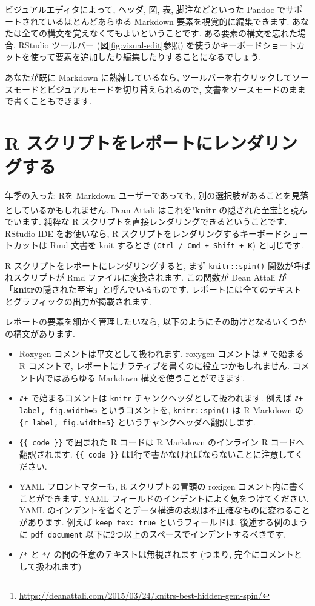 \documentclass[
  11pt,
]{bxjsreport}
\renewcommand{\href}[2]{#2\footnote{\url{#1}}}
\begin{document}
ビジュアルエディタによって, ヘッダ, 図, 表, 脚注などといった Pandoc でサポートされているほとんどあらゆる Markdown 要素を視覚的に編集できます. あなたは全ての構文を覚えなくてもよいということです. ある要素の構文を忘れた場合, RStudio ツールバー (図\ref{fig:visual-edit}参照) を使うかキーボードショートカットを使って要素を追加したり編集したりすることになるでしょう.

あなたが既に Markdown に熟練しているなら, ツールバーを右クリックしてソースモードとビジュアルモードを切り替えられるので, 文書をソースモードのままで書くこともできます.

\hypertarget{spin}{%
\section{R スクリプトをレポートにレンダリングする}\label{spin}}

年季の入った Rを Markdown ユーザーであっても, 別の選択肢があることを見落としているかもしれません. Dean Attali はこれを\href{https://deanattali.com/2015/03/24/knitrs-best-hidden-gem-spin/}{"\textbf{knitr} の隠された至宝}と読んでいます. 純粋な R スクリプトを直接レンダリングできるということです. RStudio IDE をお使いなら, R スクリプトをレンダリングするキーボードショートカットは Rmd 文書を knit するとき (\texttt{Ctrl / Cmd + Shift + K}) と同じです.

R スクリプトをレポートにレンダリングすると, まず \texttt{knitr::spin()} 関数が呼ばれスクリプトが Rmd ファイルに変換されます. この関数が Dean Attali が「\textbf{knitr}の隠された至宝」と呼んでいるものです. レポートには全てのテキストとグラフィックの出力が掲載されます.

レポートの要素を細かく管理したいなら, 以下のようにその助けとなるいくつかの構文があります.

\begin{itemize}
\item
  Roxygen コメントは平文として扱われます. roxygen コメントは \texttt{\#\textquotesingle{}} で始まる R コメントで, レポートにナラティブを書くのに役立つかもしれません. コメント内ではあらゆる Markdown 構文を使うことができます.
\item
  \texttt{\#+} で始まるコメントは \texttt{knitr} チャンクヘッダとして扱われます. 例えば \texttt{\#+ label, fig.width=5} というコメントを, \texttt{knitr::spin()} は R Markdown の \texttt{\textasciigrave{}\textasciigrave{}\textasciigrave{}\{r\ label,\ fig.width=5\}} というチャンクヘッダへ翻訳します.
\item
  \texttt{\{\{ code \}\}} で囲まれた R コードは R Markdown のインライン R コードへ翻訳されます. \texttt{\{\{ code \}\}} は1行で書かなければならないことに注意してください.
\item
  YAML フロントマターも, R スクリプトの冒頭の roxigen コメント内に書くことができます. YAML フィールドのインデントによく気をつけてください. YAML のインデントを省くとデータ構造の表現は不正確なものに変わることがあります. 例えば \texttt{keep\_tex: true} というフィールドは, 後述する例のように \texttt{pdf\_document} 以下に2つ以上のスペースでインデントするべきです.
\item
  \texttt{/*} と \texttt{*/} の間の任意のテキストは無視されます (つまり, 完全にコメントとして扱われます)
\end{itemize}
\end{document}
